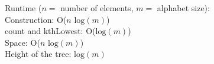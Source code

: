 
Runtime ($n = $ number of elements, $m = $ alphabet size): \\
\indent Construction: O($n\text{ log}(m)$) \\
\indent count and kthLowest: O($\text{log}(m)$) \\
Space: O($n\text{ log}(m)$) \\
\indent Height of the tree: $\text{log}(m)$



\newpage